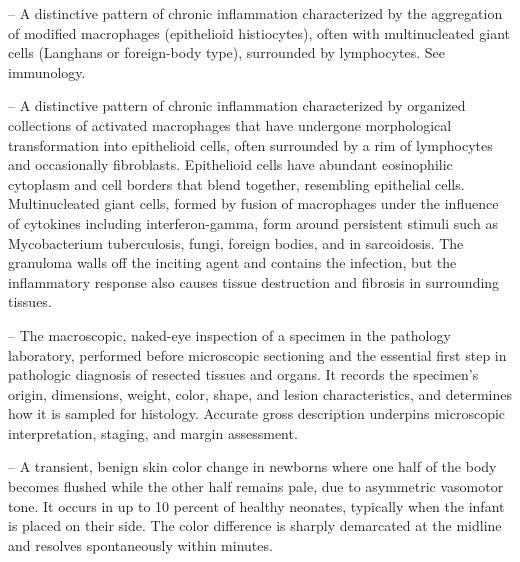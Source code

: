 -- A distinctive pattern of chronic inflammation characterized by the aggregation of modified macrophages (epithelioid histiocytes), often with multinucleated giant cells (Langhans or foreign-body type), surrounded by lymphocytes. See immunology.

-- A distinctive pattern of chronic inflammation characterized by organized collections of activated macrophages that have undergone morphological transformation into epithelioid cells, often surrounded by a rim of lymphocytes and occasionally fibroblasts. Epithelioid cells have abundant eosinophilic cytoplasm and cell borders that blend together, resembling epithelial cells. Multinucleated giant cells, formed by fusion of macrophages under the influence of cytokines including interferon-gamma, form around persistent stimuli such as Mycobacterium tuberculosis, fungi, foreign bodies, and in sarcoidosis. The granuloma walls off the inciting agent and contains the infection, but the inflammatory response also causes tissue destruction and fibrosis in surrounding tissues.

-- The macroscopic, naked-eye inspection of a specimen in the pathology laboratory, performed before microscopic sectioning and the essential first step in pathologic diagnosis of resected tissues and organs. It records the specimen's origin, dimensions, weight, color, shape, and lesion characteristics, and determines how it is sampled for histology. Accurate gross description underpins microscopic interpretation, staging, and margin assessment.

-- A transient, benign skin color change in newborns where one half of the body becomes flushed while the other half remains pale, due to asymmetric vasomotor tone. It occurs in up to 10 percent of healthy neonates, typically when the infant is placed on their side. The color difference is sharply demarcated at the midline and resolves spontaneously within minutes.

